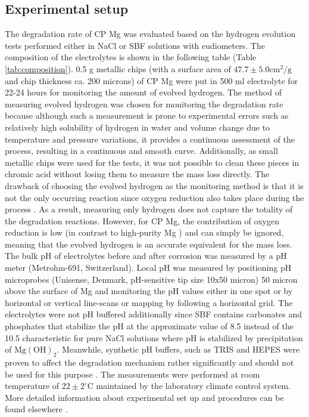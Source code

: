 \subsection{Experimental setup}

The degradation rate of {CP} Mg was evaluated based on the hydrogen evolution tests  performed either in  NaCl or {SBF} solutions with eudiometers. The composition of the electrolytes is  shown in the following table (Table \ref{tab:composition}). 0.5 g metallic chips (with a surface area of $47.7\pm5.0 \mathrm{cm}^2/\mathrm{g}$ and chip thickness ca. 200 microns) of {CP} Mg were put in 500 ml electrolyte for 22-24 hours for monitoring the amount of evolved hydrogen. The method of measuring evolved hydrogen was chosen for monitoring the degradation rate because although such a measurement is prone to experimental errors such as relatively high solubility of hydrogen in water and volume change due to temperature and pressure variations, it provides a continuous assessment of the process, resulting in a continuous and smooth curve. Additionally, as small metallic chips were used for the tests, it was not possible to clean these pieces in chromic acid without losing them to measure the mass loss directly. The drawback of choosing the evolved hydrogen as the monitoring method is that it is not the only occurring reaction since oxygen reduction also takes place during the process \cite{Wang2020,Strebl2020,Silva2018}. As a result,  measuring only hydrogen does not capture the totality of the degradation reactions. However, for {CP} Mg, the contribution of oxygen reduction is low (in contrast to high-purity Mg \cite{Wang2020}) and can simply be ignored, meaning that the evolved hydrogen is an accurate equivalent for the mass loss. The bulk pH of electrolytes before and after corrosion was measured by a pH meter (Metrohm-691, Switzerland). Local pH was measured by positioning pH microprobes (Unisense, Denmark, pH-sensitive tip size 10x50 micron) 50 micron above the surface of Mg and monitoring the pH values either in one spot or by horizontal or vertical line-scans or mapping by following a horizontal grid. The electrolytes were not pH buffered additionally since {SBF} contains carbonates and phosphates that stabilize the pH at the approximate value of 8.5 instead of the 10.5 characteristic for pure NaCl solutions where pH is stabilized by precipitation of $\mathrm{Mg}(\mathrm{OH})_{2}$.  Meanwhile, synthetic pH buffers, such as TRIS and HEPES were proven to affect the degradation mechanism rather significantly and should not be used for this purpose \cite{Mei2020}. The measurements were performed at room temperature of $22\pm2^{\circ}\mathrm{C}$ maintained by the laboratory climate control system. More detailed information about experimental set up and procedures  can be found  elsewhere \cite{Mei2019,Mei2019a}.


